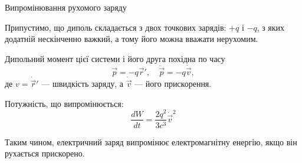 \documentclass[9pt]{beamer}
\let\vect\vec
\begin{document}
\begin{frame}{Випромінювання рухомого заряду}{}
	\begin{overprint}
		\begin{block}{}\justifying
			Припустимо, що диполь складається з двох точкових зарядів: $ +q $ і $ -q $, з яких додатній нескінченно важкий, а тому його можна вважати нерухомим.
		\end{block}
		\begin{block}{}\centering
		\end{block}
	\end{overprint}

	\medskip

	Дипольний момент цієї системи і його друга похідна по часу
	\begin{equation*}
		\vect{p} = -q\vect{r}', \quad \ddot{\vect{p}} = -q\dot{\vect{v}},
	\end{equation*}
	де $ v =  \dot{\vect{r}}'  $ --- швидкість заряду, а $ \dot{\vect{v}} $ --- його прискорення.

	Потужність, що випромінюється:
	\begin{equation*}
		\frac{d W}{dt}  = \frac{2q^2}{3c^3}\dot{\vect{v}}^2
	\end{equation*}

	\begin{alertblock}{}
		Таким чином, електричний заряд випромінює електромагнітну
		енергію, якщо він рухається прискорено.
	\end{alertblock}
\end{frame}
\end{document}
